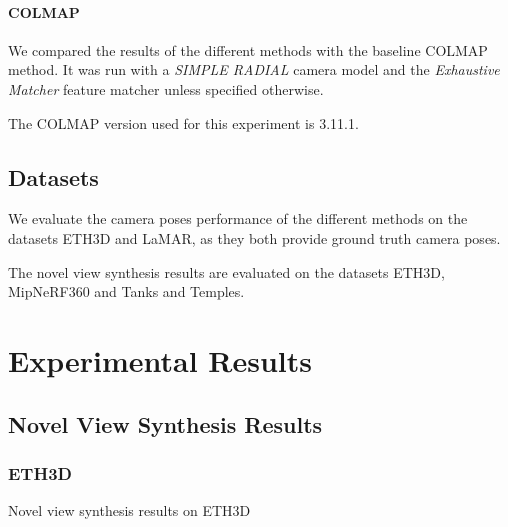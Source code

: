 \paragraph{COLMAP}
We compared the results of the different methods with the baseline COLMAP method.
It was run with a \textit{SIMPLE RADIAL} camera model and the \textit{Exhaustive Matcher} feature matcher unless specified otherwise.

The COLMAP version used for this experiment is 3.11.1.

\subsection{Datasets}
We evaluate the camera poses performance of the different methods on the datasets ETH3D and LaMAR, as they both provide ground truth camera poses.

The novel view synthesis results are evaluated on the datasets ETH3D, MipNeRF360 and Tanks and Temples.


\section{Experimental Results}\label{sec:experimental-results}

\newpage
\subsection{Novel View Synthesis Results}\label{sec:gs-evaluation-results}

\subsubsection{ETH3D}\label{sec:gs-evaluation-results-eth3d}
Novel view synthesis results on ETH3D



